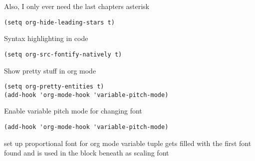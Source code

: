 \documentclass[11pt]{article}
\begin{document}
Also, I only ever need the last chapters asterisk
\begin{verbatim}
(setq org-hide-leading-stars t)
\end{verbatim}
Syntax highlighting in code
\begin{verbatim}
(setq org-src-fontify-natively t)
\end{verbatim}
Show pretty stuff in org mode
\begin{verbatim}
(setq org-pretty-entities t)
(add-hook 'org-mode-hook 'variable-pitch-mode)
\end{verbatim}
Enable variable pitch mode for changing font
\begin{verbatim}
(add-hook 'org-mode-hook 'variable-pitch-mode)
\end{verbatim}
set up proportional font for org mode
variable tuple gets filled with the first font found and is used
in the block beneath as scaling font
\end{document}
